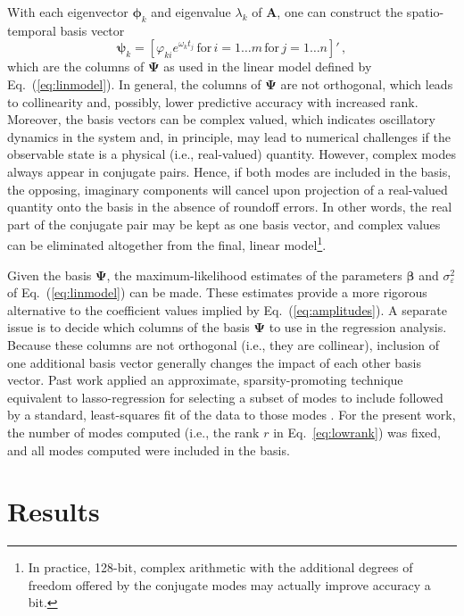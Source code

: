 \documentclass[review,number,sort&compress,12pt]{elsarticle}
\begin{document}
With each eigenvector $\boldsymbol{\phi}_k$ and eigenvalue $\lambda_k$ of $\mathbf{A}$, one can construct the spatio-temporal basis vector
\begin{equation}
  \boldsymbol{\psi}_k = 
    [\varphi_{ki} e^{\omega_k t_j} \, \text{for} \, i =1\ldots m \, \text{for} \, j = 1\ldots n]' \, ,
\end{equation}
which are the columns of $\boldsymbol{\Psi}$ as used in the linear model defined by Eq.~(\ref{eq:linmodel}).
In general, the columns of $\boldsymbol{\Psi}$ are not orthogonal, which leads to collinearity and, possibly, lower predictive accuracy with increased rank.  
Moreover, the basis vectors can be complex valued, which indicates oscillatory dynamics in the system and, in principle, may lead to  numerical challenges if the observable state is a physical (i.e., real-valued) quantity.
However, complex modes always appear in conjugate pairs. 
Hence, if both modes are included in the basis, the opposing, imaginary components will cancel upon projection of a real-valued quantity onto the basis in the absence of roundoff errors.
In other words, the real part of the conjugate pair may be kept as one basis vector, and complex values can be eliminated altogether from the final, linear model\footnote{In practice, 128-bit, complex arithmetic with the additional degrees of freedom offered by the conjugate modes may actually improve accuracy a bit.}.

Given the basis $\boldsymbol{\Psi}$, the maximum-likelihood estimates of the parameters $\boldsymbol{\beta}$ and $\sigma^2_{\varepsilon}$ of Eq.~(\ref{eq:linmodel}) can be made.
These estimates provide a more rigorous alternative to the coefficient values implied by Eq.~(\ref{eq:amplitudes}).  
A separate issue is to decide which columns of the basis $\boldsymbol{\Psi}$ to use in the regression analysis.
Because these columns are not orthogonal (i.e., they are collinear), inclusion of one additional basis vector generally changes the impact of each other basis vector.
Past work applied an approximate, sparsity-promoting technique equivalent to lasso-regression for selecting a subset of modes to include followed by a standard, least-squares fit of the data to those modes \cite{jovanovic}.
For the present work, the number of modes computed (i.e., the rank $r$ in Eq.~\ref{eq:lowrank}) was fixed, and all modes computed were included in the basis.


\section{Results}
\label{sec:results}
\end{document}
